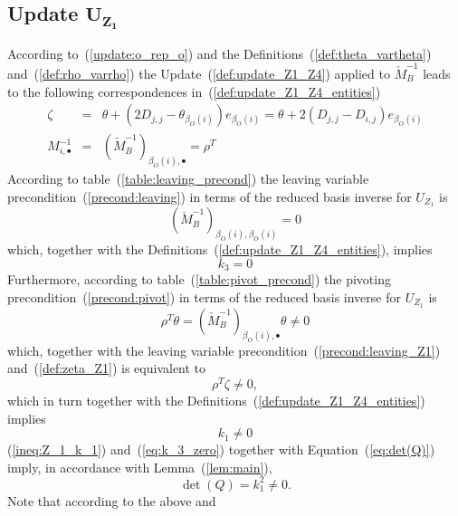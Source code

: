 \documentclass[a4paper]{article}
\begin{document}
\subsection{Update $\mathbf{U_{Z_{1}}}$}
According to~(\ref{update:o_rep_o}) and the
Definitions~(\ref{def:theta_vartheta}) 
and~(\ref{def:rho_varrho}) the
Update~(\ref{def:update_Z1_Z4}) applied to $\check{M}_{B}^{-1}$
leads to the following correspondences
in~(\ref{def:update_Z1_Z4_entities})
\begin{eqnarray}
\label{def:zeta_Z1}
\zeta
&=&
\theta + \left(2D_{j,j}-\theta_{\beta_{O}(i)}\right)e_{\beta_{O}(i)}
= \theta+2\left(D_{j,j}-D_{i,j}\right)e_{\beta_{O}(i)} \\
M_{i, \bullet}^{-1}
&=&
\left(\check{M}_{B}^{-1}\right)_{\beta_{O}(i), \bullet}
= \rho^{T}
\end{eqnarray}
According to table~(\ref{table:leaving_precond})
the leaving variable precondition~(\ref{precond:leaving})
in terms of the reduced basis inverse for $U_{Z_{1}}$ is 
\begin{equation}
\label{precond:leaving_Z1}
\left(\check{M}_{B}^{-1}\right)_{\beta_{O}(i),\beta_{O}(i)}=0 
\end{equation}
which, together with the Definitions~(\ref{def:update_Z1_Z4_entities}),
implies
\begin{equation}
\label{eq:k_3_zero}
k_{3} = 0
\end{equation}
Furthermore, according to table~(\ref{table:pivot_precond}) the
pivoting precondition~(\ref{precond:pivot})
in terms of the reduced basis inverse for $U_{Z_{1}}$ is
\begin{equation*}
\rho^{T}\theta
=
\left(\check{M}_{B}^{-1}\right)_{\beta_{O}(i), \bullet}\theta \neq 0
\end{equation*}
which, together with the leaving variable
precondition~(\ref{precond:leaving_Z1}) and~(\ref{def:zeta_Z1}) is equivalent
to
\begin{equation*}
\rho^{T}\zeta \neq 0,
\end{equation*}  
which in turn together with the Definitions~(\ref{def:update_Z1_Z4_entities})
implies 
\begin{equation}
\label{ineq:Z_1_k_1}
k_{1} \neq 0
\end{equation}
(\ref{ineq:Z_1_k_1}) and~(\ref{eq:k_3_zero}) together with
Equation~(\ref{eq:det(Q)}) imply, in accordance with Lemma~(\ref{lem:main}),  
\begin{equation}
\det(Q)=k_{1}^{2} \neq 0.
\end{equation}
Note that according to the above and
\end{document}
